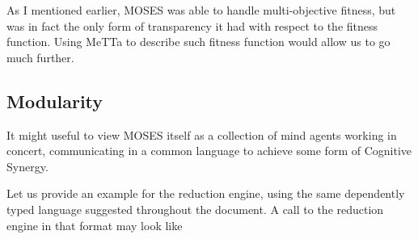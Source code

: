 \documentclass[]{report}
\begin{document}
As I mentioned earlier, MOSES was able to handle multi-objective
fitness, but was in fact the only form of transparency it had with
respect to the fitness function.  Using MeTTa to describe such fitness
function would allow us to go much further.

\subsection{Modularity}

It might useful to view MOSES itself as a collection of mind agents
working in concert, communicating in a common language to achieve some
form of Cognitive Synergy.

Let us provide an example for the reduction engine, using the same
dependently typed language suggested throughout the document.  A call
to the reduction engine in that format may look like
\end{document}
